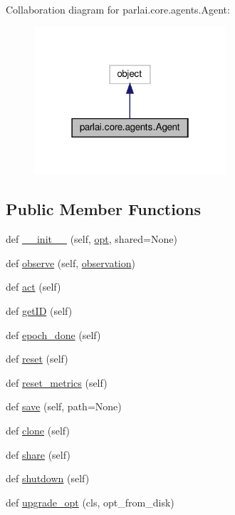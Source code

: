 Collaboration diagram for parlai.\+core.\+agents.\+Agent\+:
\nopagebreak
\begin{figure}[H]
\begin{center}
\leavevmode
\includegraphics[width=202pt]{d1/d2f/classparlai_1_1core_1_1agents_1_1Agent__coll__graph}
\end{center}
\end{figure}
\subsection*{Public Member Functions}
\begin{DoxyCompactItemize}
\item 
def \hyperlink{classparlai_1_1core_1_1agents_1_1Agent_aa7992ab392e2803607937e805ceb176f}{\+\_\+\+\_\+init\+\_\+\+\_\+} (self, \hyperlink{classparlai_1_1core_1_1agents_1_1Agent_ab3b45d2754244608c75d4068b90cd051}{opt}, shared=None)
\item 
def \hyperlink{classparlai_1_1core_1_1agents_1_1Agent_a98041e2d186aa81bd5e1649a91f623bc}{observe} (self, \hyperlink{classparlai_1_1core_1_1agents_1_1Agent_aedbecc4b4aa7af7413882a0429e0f1db}{observation})
\item 
def \hyperlink{classparlai_1_1core_1_1agents_1_1Agent_a6a8abe0a98dd59bc39c9f12b163072db}{act} (self)
\item 
def \hyperlink{classparlai_1_1core_1_1agents_1_1Agent_a29e1cdd729ac4236f8bae90b2e66fa04}{get\+ID} (self)
\item 
def \hyperlink{classparlai_1_1core_1_1agents_1_1Agent_a40157e237ea85d75ebc3fd248c7a1a1b}{epoch\+\_\+done} (self)
\item 
def \hyperlink{classparlai_1_1core_1_1agents_1_1Agent_a27cb8206372681605b00dc28b81a7c39}{reset} (self)
\item 
def \hyperlink{classparlai_1_1core_1_1agents_1_1Agent_aaefcbd7c61d319b368b3ee13997c8c99}{reset\+\_\+metrics} (self)
\item 
def \hyperlink{classparlai_1_1core_1_1agents_1_1Agent_a51e706e3e5389c9b48c7a1589d97ec99}{save} (self, path=None)
\item 
def \hyperlink{classparlai_1_1core_1_1agents_1_1Agent_a2525db5bdd19a3bf5b0669bfa158f9ff}{clone} (self)
\item 
def \hyperlink{classparlai_1_1core_1_1agents_1_1Agent_afbbb06bf0f46ff927c8b186726a68b47}{share} (self)
\item 
def \hyperlink{classparlai_1_1core_1_1agents_1_1Agent_a801e5ca2a5e8e96a72f0c04549008e8f}{shutdown} (self)
\item 
def \hyperlink{classparlai_1_1core_1_1agents_1_1Agent_a005f62f977e8a7ebf91b9646307153bc}{upgrade\+\_\+opt} (cls, opt\+\_\+from\+\_\+disk)
\end{DoxyCompactItemize}
